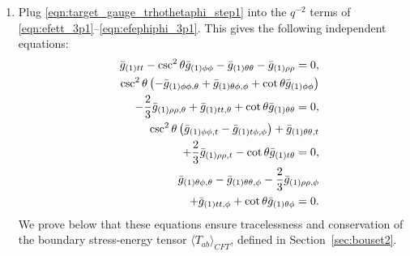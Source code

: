 \documentclass[aps,letterpaper,twocolumn,nofootinbib]{revtex4}
\numberwithin{equation}{section}
\begin{document}
\begin{enumerate}
\item Plug \eqref{eqn:target_gauge_trhothetaphi_step1} into the $q^{-2}$ terms of \eqref{eqn:efett_3p1}--\eqref{eqn:efephiphi_3p1}. This gives the following independent equations:
\begin{eqnarray}
\label{eq:indeq1_3p1}
&&\bar{g}_{(1) \text{$tt$}}-\csc ^2\theta\bar{g}_{(1) \phi \phi }-\bar{g}_{(1)\theta \theta }-\bar{g}_{(1) \rho \rho }=0, \\
\label{eq:indeq2_3p1}
&&\hspace{-0.4cm} \csc ^2\theta \left(-\bar{g}_{(1) \phi \phi ,\theta }+\bar{g}_{(1)\theta \phi,\phi}+\cot \theta  \bar{g}_{(1) \phi \phi }\right)\nonumber \\
   &&\hspace{0.5cm} -\frac{2}{3} \bar{g}_{(1) \rho \rho,\theta } +\bar{g}_{(1) \text{$tt$},\theta }+\cot \theta  \bar{g}_{(1)\theta \theta}=0,\\
   \label{eq:indeq3_3p1}
&&\hspace{-0.4cm}\csc ^2\theta 
   \left(\bar{g}_{(1) \phi \phi ,t}-\bar{g}_{(1) \text{$t$$\phi $},\phi }\right)+\bar{g}_{(1)\theta \theta,t}\nonumber \\
   &&\hspace{2.0cm}+\frac{2}{3} \bar{g}_{(1) \rho \rho ,t}-\cot \theta\bar{g}_{(1) \text{$t$$\theta $}}=0,\\
      \label{eq:indeq4_3p1}
&&\hspace{-0.4cm}\bar{g}_{(1)\theta \phi,\theta }-\bar{g}_{(1)\theta \theta,\phi }-\frac{2}{3} \bar{g}_{(1)\rho \rho ,\phi }\nonumber \\
   &&\hspace{2.2cm}+\bar{g}_{(1) \text{$tt$},\phi }+\cot \theta \bar{g}_{(1)\theta \phi}=0.
\end{eqnarray}
We prove below that these equations ensure tracelessness and conservation of the boundary stress-energy tensor $\langle T_{ab}\rangle_{CFT}$, defined in Section~\ref{sec:bouset2}.


\end{enumerate}
\end{document}
